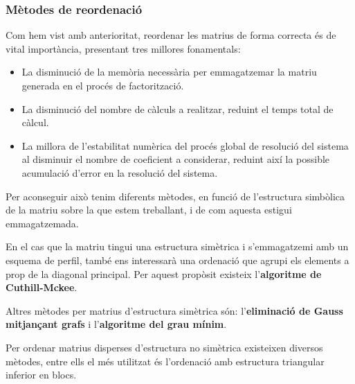 \documentclass[8pt]{beamer}
\begin{document}
\begin{frame}
  \frametitle{Mètodes de reordenació}
Com hem vist amb anterioritat, reordenar les matrius de forma correcta és de vital importància, presentant tres millores fonamentals:

\begin{itemize}
	\item La disminució de la memòria necessària per emmagatzemar la matriu generada en el procés de factorització.
	\item La disminució del nombre de càlculs a realitzar, reduint el temps total de càlcul.
	\item La millora de l'estabilitat numèrica del procés global de resolució del sistema al disminuir el nombre de coeficient a considerar, reduint així la possible acumulació d'error en la resolució del sistema.
\end{itemize}

Per aconseguir això tenim diferents mètodes, en funció de l'estructura simbòlica de la matriu sobre la que estem treballant, i de com aquesta estigui emmagatzemada.
 
En el cas que la matriu tingui una estructura simètrica i s'emmagatzemi amb un esquema de perfil, també ens interessarà una ordenació que agrupi els elements a prop de la diagonal principal. Per aquest propòsit existeix l'\textbf{algoritme de Cuthill-Mckee}.

Altres mètodes per matrius d'estructura simètrica són: l'\textbf{eliminació de Gauss mitjançant grafs} i l'\textbf{algoritme del grau mínim}.


Per ordenar matrius disperses d'estructura no simètrica existeixen diversos mètodes, entre ells el més utilitzat és l'ordenació amb estructura triangular inferior en blocs.

\end{frame}
\end{document}
